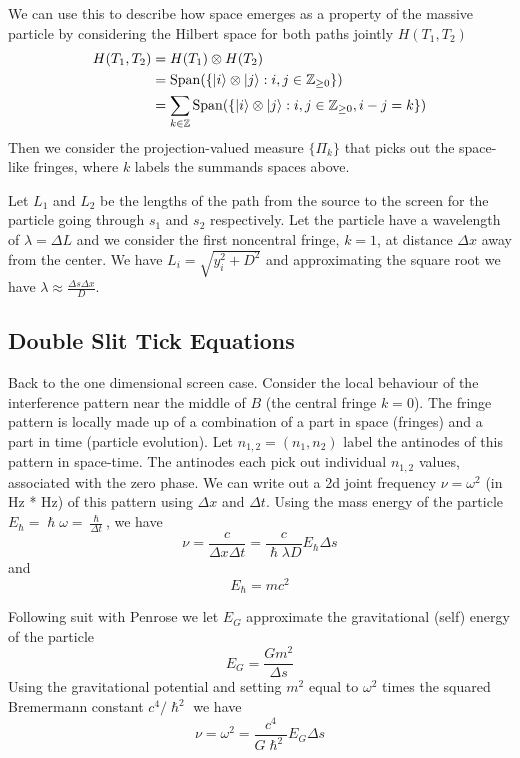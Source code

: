 \documentclass[12pt,a4paper]{article}
\begin{document}
We can use this to describe how space emerges as a property of the massive particle by considering the Hilbert space for both paths jointly $H(T_1,T_2)$
\[
\begin{split}
  H(T_1,T_2) &= H(T_1) \otimes H(T_2) \\
  & = \mathrm{Span}(\{\ket{i} \otimes \ket{j}: i,j \in \mathbb{Z}_{\ge 0}\}) \\
  & = \sum_{k \in \mathbb{Z}} \mathrm{Span}(\{\ket{i} \otimes \ket{j} : i,j \in \mathbb{Z}_{\ge 0}, i-j = k\}) \\
\end{split}
\]
Then we consider the projection-valued measure $\{\Pi_k\}$ that picks out the space-like fringes, where $k$ labels the summands spaces above.

Let $L_1$ and $L_2$ be the lengths of the path from the source to the screen for the particle going through $s_1$ and $s_2$ respectively. Let the particle have a wavelength of $\lambda = \Delta L$ and we consider the first noncentral fringe, $k=1$, at distance $\Delta x$ away from the center.  We have $L_i = \sqrt{y_i^2 + D^2}$ and approximating the square root we have $\lambda \approx \frac{\Delta s \Delta x}{D}$.

\subsection{Double Slit Tick Equations}
Back to the one dimensional screen case.  Consider the local behaviour of the interference pattern near the middle of $B$ (the central fringe $k=0$). The fringe pattern is locally made up of a combination of a part in space (fringes) and a part in time (particle evolution). Let $n_{1,2} = (n_1, n_2)$ label the antinodes of this pattern in space-time. The antinodes each pick out individual $n_{1,2}$ values, associated with the zero phase. We can write out a 2d joint frequency $\nu = \omega^2$ (in Hz * Hz) of this pattern using $\Delta x$ and $\Delta t$.  Using the mass energy of the particle $E_\hslash = \hslash \omega = \frac{\hslash}{\Delta t}$, we have
\begin{equation}
\label{nu_h}
  \nu = \frac{c}{\Delta x \Delta t} = \frac{c}{\hslash \lambda D} E_\hslash \Delta{s}
\end{equation}
and
\begin{equation}
\label{def_h}
E_\hslash = m c^2
\end{equation}


Following suit with Penrose\cite{penrose} we let $E_G$ approximate the gravitational (self) energy of the particle 
\begin{equation}
\label{def_G}
E_G = \frac{G m^2}{\Delta s}
\end{equation}
Using the gravitational potential and setting $m^2$  equal to $\omega^2$ times the squared Bremermann constant $c^4/\hslash^2$ we have
\begin{equation}
\label{nu_G}
\nu = \omega^2 = \frac{c^4}{G \hslash^2} E_G \Delta s
\end{equation}
\end{document}
